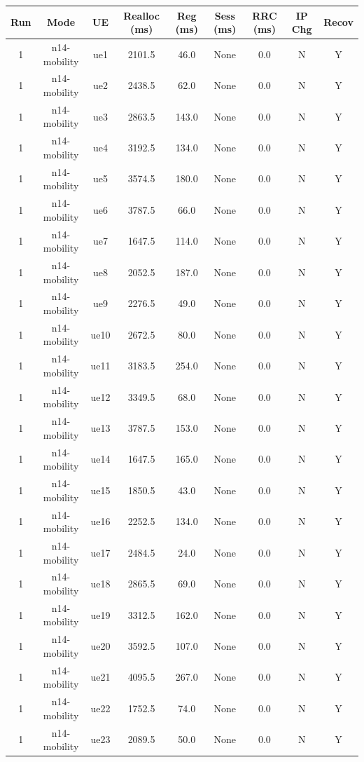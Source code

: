 \begin{table}[ht]
\centering
\begin{tabular}{|c|c|c|c|c|c|c|c|c|}
\hline
Run & Mode & UE & Realloc (ms) & Reg (ms) & Sess (ms) & RRC (ms) & IP Chg & Recov \\
\hline
1 & n14-mobility & ue1 & 2101.5 & 46.0 & None & 0.0 & N & Y \\
1 & n14-mobility & ue2 & 2438.5 & 62.0 & None & 0.0 & N & Y \\
1 & n14-mobility & ue3 & 2863.5 & 143.0 & None & 0.0 & N & Y \\
1 & n14-mobility & ue4 & 3192.5 & 134.0 & None & 0.0 & N & Y \\
1 & n14-mobility & ue5 & 3574.5 & 180.0 & None & 0.0 & N & Y \\
1 & n14-mobility & ue6 & 3787.5 & 66.0 & None & 0.0 & N & Y \\
1 & n14-mobility & ue7 & 1647.5 & 114.0 & None & 0.0 & N & Y \\
1 & n14-mobility & ue8 & 2052.5 & 187.0 & None & 0.0 & N & Y \\
1 & n14-mobility & ue9 & 2276.5 & 49.0 & None & 0.0 & N & Y \\
1 & n14-mobility & ue10 & 2672.5 & 80.0 & None & 0.0 & N & Y \\
1 & n14-mobility & ue11 & 3183.5 & 254.0 & None & 0.0 & N & Y \\
1 & n14-mobility & ue12 & 3349.5 & 68.0 & None & 0.0 & N & Y \\
1 & n14-mobility & ue13 & 3787.5 & 153.0 & None & 0.0 & N & Y \\
1 & n14-mobility & ue14 & 1647.5 & 165.0 & None & 0.0 & N & Y \\
1 & n14-mobility & ue15 & 1850.5 & 43.0 & None & 0.0 & N & Y \\
1 & n14-mobility & ue16 & 2252.5 & 134.0 & None & 0.0 & N & Y \\
1 & n14-mobility & ue17 & 2484.5 & 24.0 & None & 0.0 & N & Y \\
1 & n14-mobility & ue18 & 2865.5 & 69.0 & None & 0.0 & N & Y \\
1 & n14-mobility & ue19 & 3312.5 & 162.0 & None & 0.0 & N & Y \\
1 & n14-mobility & ue20 & 3592.5 & 107.0 & None & 0.0 & N & Y \\
1 & n14-mobility & ue21 & 4095.5 & 267.0 & None & 0.0 & N & Y \\
1 & n14-mobility & ue22 & 1752.5 & 74.0 & None & 0.0 & N & Y \\
1 & n14-mobility & ue23 & 2089.5 & 50.0 & None & 0.0 & N & Y \\

\end{tabular}
\end{table}
